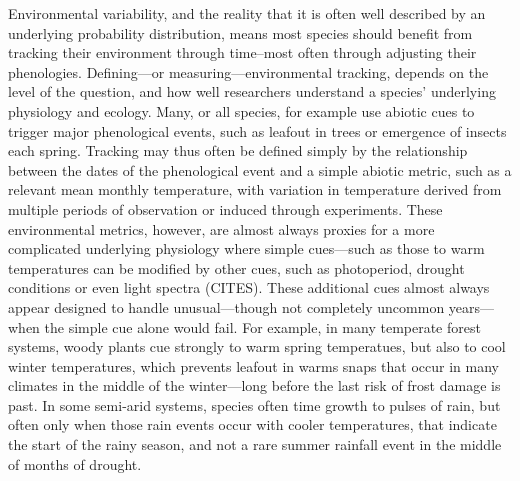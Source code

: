 \documentclass[11pt,letterpaper]{article}
\begin{document}
Environmental variability, and the reality that it is often well described by an underlying probability distribution, means most species should benefit from tracking their environment through time--most often through adjusting their phenologies. Defining---or measuring---environmental tracking, depends on the level of the question, and how well researchers understand a species' underlying physiology and ecology. Many, or all species, for example use abiotic cues to trigger major phenological events, such as leafout in trees or emergence of insects each spring. Tracking may thus often be defined simply by the relationship between the dates of the phenological event and a simple abiotic metric, such as a relevant mean monthly temperature, with variation in temperature derived from multiple periods of observation or induced through experiments. These environmental metrics, however, are almost always proxies for a more complicated underlying physiology where simple cues---such as those to warm temperatures can be modified by other cues, such as photoperiod, drought conditions or even light spectra (CITES). These additional cues almost always appear designed to handle unusual---though not completely uncommon years---when the simple cue alone would fail. For example, in many temperate forest systems, woody plants cue strongly to warm spring temperatues, but also to cool winter temperatures, which prevents leafout in warms snaps that occur in many climates in the middle of the winter---long before the last risk of frost damage is past. In some semi-arid systems, species often time growth to pulses of rain, but often only when those rain events occur with cooler temperatures, that indicate the start of the rainy season, and not a rare summer rainfall event in the middle of months of drought.  %
\\
\end{document}
